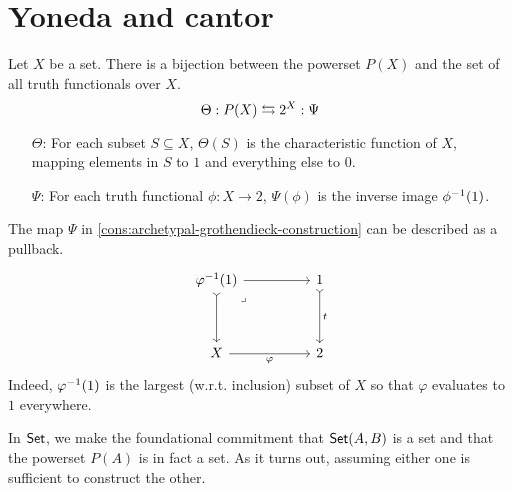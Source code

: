 \documentclass[article,10pt,oneside]{memoir}
\begin{document}
\section{Yoneda and cantor}
\label{sec:yoneda-and-cantor}

\begin{cons}\label{cons:archetypal-grothendieck-construction}
  Let $X$ be a set.
  There is a bijection between the powerset $P(X)$ and the set of all truth functionals over $X$.
  \[
    \Theta : P(X) \leftrightarrows 2^{X} : \Psi
  \]
  \begin{itemize}
  \item[$\Theta$:] For each subset $S \subseteq X$, $\Theta(S)$ is the characteristic function of $X$, mapping elements in $S$ to $1$ and everything else to $0$.
  \item[$\Psi$:] For each truth functional $\phi : X \to 2$, $\Psi(\phi)$ is the inverse image $\phi^{-1}(1)$.
  \end{itemize}
\end{cons}

\begin{rmk}
  The map $\Psi$ in \cref{cons:archetypal-grothendieck-construction} can be described as a pullback.
  \[\begin{tikzcd}
      {\varphi\inv(1)} && 1 \\
      \\
      X && 2
      \arrow["t", tail, from=1-3, to=3-3]
      \arrow["\varphi"', from=3-1, to=3-3]
      \arrow[tail, from=1-1, to=3-1]
      \arrow[from=1-1, to=1-3]
      \arrow["\lrcorner"{anchor=center, pos=0.125}, draw=none, from=1-1, to=3-3]
    \end{tikzcd}\]
  Indeed, $\varphi^{-1}(1)$ is the largest (w.r.t. inclusion) subset of $X$ so that $\varphi$ evaluates to $1$ everywhere.
\end{rmk}

\begin{rmk}
  In $\mathsf{Set}$, we make the foundational commitment that $\mathsf{Set}(A, B)$ is a set and that the powerset $P(A)$ is in fact a set.
  As it turns out, assuming either one is sufficient to construct the other.
\end{rmk}
\end{document}
